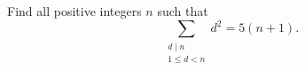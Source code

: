 Find all positive integers $n$ such that
$$\sum_{\substack{d\mid n\\[1mm] 1\leq d < n}} d^2=5(n+1).$$
